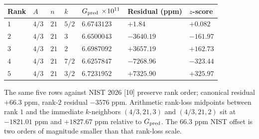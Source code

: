 \documentclass[
  11pt,
  letterpaper,
  twocolumn,
]{article}
\begin{document}
\begin{table}[!htb]
\centering\small
\begin{tabular}{@{}
  >{\raggedright\arraybackslash}p{}
  >{\raggedright\arraybackslash}p{}
  >{\raggedright\arraybackslash}p{}
  >{\raggedright\arraybackslash}p{}
  >{\raggedright\arraybackslash}p{}
  >{\raggedright\arraybackslash}p{}
  >{\raggedright\arraybackslash}p{}@{}}
\toprule
\begin{minipage}[b]{\linewidth}\raggedright
Rank
\end{minipage} & \begin{minipage}[b]{\linewidth}\raggedright
\(A\)
\end{minipage} & \begin{minipage}[b]{\linewidth}\raggedright
\(n\)
\end{minipage} & \begin{minipage}[b]{\linewidth}\raggedright
\(k\)
\end{minipage} & \begin{minipage}[b]{\linewidth}\raggedright
\(G_{\rm pred}\,\times\!10^{11}\)
\end{minipage} & \begin{minipage}[b]{\linewidth}\raggedright
Residual (ppm)
\end{minipage} & \begin{minipage}[b]{\linewidth}\raggedright
\(z\)-score
\end{minipage} \\
\midrule
\(1\) & \(4/3\) & \(21\) & \(5/2\) & \(6.6743123\) & \(+1.84\) &
\(+0.082\) \\
\(2\) & \(4/3\) & \(21\) & \(3\) & \(6.6500043\) & \(-3640.19\) &
\(-161.97\) \\
\(3\) & \(4/3\) & \(21\) & \(2\) & \(6.6987092\) & \(+3657.19\) &
\(+162.73\) \\
\(4\) & \(4/3\) & \(21\) & \(7/2\) & \(6.6257847\) & \(-7268.96\) &
\(-323.44\) \\
\(5\) & \(4/3\) & \(21\) & \(3/2\) & \(6.7231952\) & \(+7325.90\) &
\(+325.97\) \\
\bottomrule
\end{tabular}
\end{table}

The same five rows against NIST 2026 {[}10{]} preserve rank order;
canonical residual \(+66.3\) ppm, rank-\(2\) residual \(-3576\) ppm.
Arithmetic rank-loss midpoints between rank \(1\) and the immediate
\(k\)-neighbors \((4/3,21,3)\) and \((4/3,21,2)\) sit at \(-1821.01\)
ppm and \(+1827.67\) ppm relative to \(G_{\rm pred}\). The \(66.3\) ppm
NIST offset is two orders of magnitude smaller than that rank-loss
scale.
\end{document}
